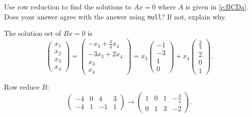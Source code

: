 \documentclass{ximera}
\begin{document}
\begin{exercise} \label{c5.3.3}
Use row reduction to find the solutions to $Ax=0$ where $A$ is
given in \eqref{e:BCDa}.  Does your answer agree with the \Matlab
answer using {\tt null}?  If not, explain why.

\begin{solution}

\ans The solution set of $Bx = 0$ is
\[
\left(\begin{array}{r} x_1 \\ x_2 \\ x_3 \\ x_4 \end{array}\right)
= \left(\begin{array}{c} -x_3 + \frac{3}{4}x_4 \\ -3x_3 + 2x_4 \\
x_3 \\ x_4 \end{array}\right) = x_3\left(\begin{array}{r} -1 \\ -3 \\
1 \\ 0 \end{array}\right) + x_4\left(\begin{array}{r} \frac{3}{4} \\
2 \\ 0 \\ 1 \end{array}\right).
\]

\soln Row reduce $B$:
\[
\left(\begin{array}{rrrr} -4 & 0 & 4 & 3 \\ -4 & 1 & -1 & 1
\end{array}\right) \longrightarrow \left(\begin{array}{rrrr}
1 & 0 & 1 & -\frac{3}{4} \\ 0 & 1 & 3 & -2 \end{array}\right).
\]


\end{solution}
\end{exercise}
\end{document}
